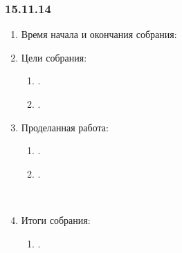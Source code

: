 
\subsubsection{15.11.14}

\begin{enumerate} 
	\item Время начала и окончания собрания:\newline
	
	\item Цели собрания:
	\begin{enumerate}
		\item .
		
		\item .
		
	\end{enumerate}
	
	\item Проделанная работа:
	\begin{enumerate}
		\item .
		
		\item .
		
	    \begin{figure}[H]
			\begin{minipage}[h]{0.2\linewidth}
				\center  
			\end{minipage}
			\begin{minipage}[h]{0.6\linewidth}
				\caption{}
			\end{minipage}
		\end{figure}
		
	\end{enumerate}
	
	\item Итоги собрания:
	\begin{enumerate}
		\item .
		

\end{enumerate}
\end{enumerate}
